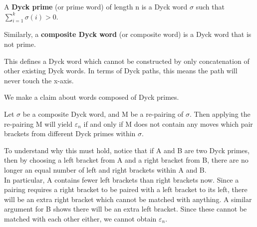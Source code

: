 \begin{definition}
    A \textbf{Dyck prime} (or prime word) of length n is a Dyck word $\sigma$ such that $\sum_{i = 1}^{k} \sigma(i) > 0$.

    Similarly, a \textbf{composite Dyck word} (or composite word) is a Dyck word that is not prime.
\end{definition}

This defines a Dyck word which cannot be constructed by only concatenation of other existing Dyck words. In terms of Dyck paths, this means the path will never touch the x-axis. 

We make a claim about words composed of Dyck primes.

\begin{claim}
    Let $\sigma$ be a composite Dyck word, and M be a re-pairing of $\sigma$. Then applying the re-pairing M will yield $\varepsilon_n$ if and only if M does not contain any moves which pair brackets from different Dyck primes within $\sigma$.
\end{claim}
To understand why this must hold, notice that if A and B are two Dyck primes, then by choosing a left bracket from A and a right bracket from B, there are no longer an equal number of left and right brackets within A and B. 
\\ In particular, A contains fewer left brackets than right brackets now. Since a pairing requires a right bracket to be paired with a left bracket to its left, there will be an extra right bracket which cannot be matched with anything. A similar argument for B shows there will be an extra left bracket. Since these cannot be matched with each other either, we cannot obtain $\varepsilon_n$.